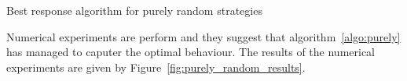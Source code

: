 \documentclass[10pt]{article}
\makeatletter
\def\BState{\State\hskip-\ALG@thistlm}
\makeatother
\begin{document}
\begin{algorithm}
    \caption{Best response algorithm for purely random strategies}\label{algo:purely}
    \end{algorithm}

Numerical experiments are perform and they suggest that algorithm~\ref{algo:purely}
has managed to caputer the optimal behaviour. The results of the numerical experiments
are given by Figure~\ref{fig:purely_random_results}.
\end{document}
